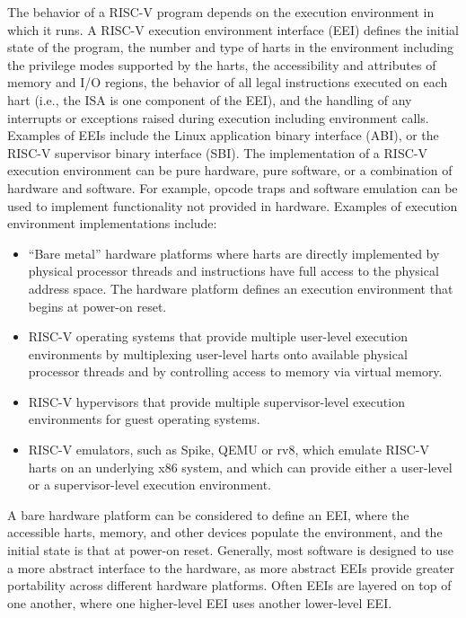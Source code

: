 The behavior of a RISC-V program depends on the execution environment
in which it runs.  A RISC-V execution environment interface (EEI)
defines the initial state of the program, the number and type of harts
in the environment including the privilege modes supported by the
harts, the accessibility and attributes of memory and I/O regions, the
behavior of all legal instructions executed on each hart (i.e., the
ISA is one component of the EEI), and the handling of any interrupts
or exceptions raised during execution including environment calls.
Examples of EEIs include the Linux application binary interface (ABI),
or the RISC-V supervisor binary interface (SBI).  The implementation
of a RISC-V execution environment can be pure hardware, pure software,
or a combination of hardware and software.  For example, opcode traps
and software emulation can be used to implement functionality not
provided in hardware.  Examples of execution environment
implementations include:
\begin{itemize}
  \item ``Bare metal'' hardware platforms where harts are directly
    implemented by physical processor threads and instructions have
    full access to the physical address space.  The hardware platform
    defines an execution environment that begins at power-on reset.
  \item RISC-V operating systems that provide multiple user-level
    execution environments by multiplexing user-level harts onto
    available physical processor threads and by controlling access to
    memory via virtual memory.
  \item RISC-V hypervisors that provide multiple supervisor-level
    execution environments for guest operating systems.
  \item RISC-V emulators, such as Spike, QEMU or rv8, which emulate
    RISC-V harts on an underlying x86 system, and which can provide
    either a user-level or a supervisor-level execution environment.
\end{itemize}

\begin{commentary}
  A bare hardware platform can be considered to define an EEI, where
  the accessible harts, memory, and other devices populate the
  environment, and the initial state is that at power-on reset.
  Generally, most software is designed to use a more abstract
  interface to the hardware, as more abstract EEIs provide greater
  portability across different hardware platforms.  Often EEIs are
  layered on top of one another, where one higher-level EEI uses
  another lower-level EEI.
\end{commentary}

